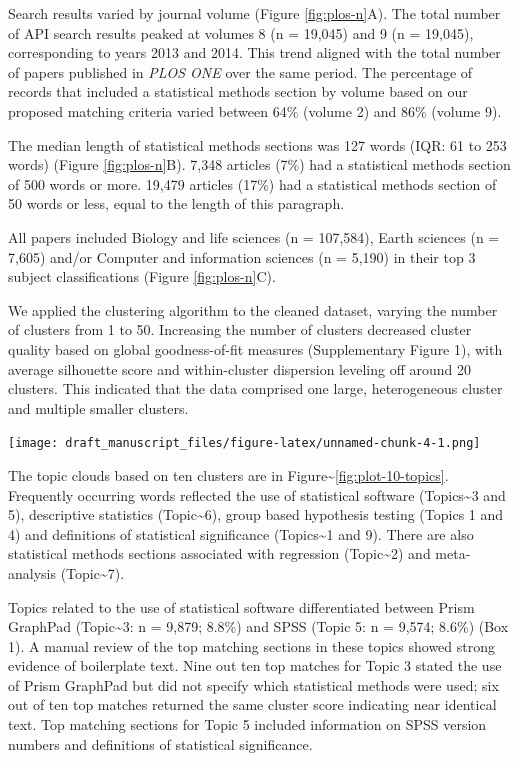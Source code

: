 \documentclass[
]{article}
\begin{document}
Search results varied by journal volume (Figure \ref{fig:plos-n}A). The total number of API search results peaked at volumes 8 (n = 19,045) and 9 (n = 19,045), corresponding to years 2013 and 2014. This trend aligned with the total number of papers published in \emph{PLOS ONE} over the same period. The percentage of records that included a statistical methods section by volume based on our proposed matching criteria varied between 64\% (volume 2) and 86\% (volume 9).

The median length of statistical methods sections was 127 words (IQR: 61 to 253 words) (Figure \ref{fig:plos-n}B). 7,348 articles (7\%) had a statistical methods section of 500 words or more. 19,479 articles (17\%) had a statistical methods section of 50 words or less, equal to the length of this paragraph.

All papers included Biology and life sciences (n = 107,584), Earth sciences
(n = 7,605) and/or Computer and information sciences (n = 5,190) in their top 3 subject classifications
(Figure \ref{fig:plos-n}C).

We applied the clustering algorithm to the cleaned dataset, varying the number of clusters from 1 to 50. Increasing the number of clusters decreased cluster quality based on global goodness-of-fit measures (Supplementary Figure 1), with average silhouette score and within-cluster dispersion leveling off around 20 clusters. This indicated that the data comprised one large, heterogeneous cluster and multiple smaller clusters.

\texttt{[image: draft\_manuscript\_files/figure-latex/unnamed-chunk-4-1.png]}

The topic clouds based on ten clusters are in Figure\textasciitilde\ref{fig:plot-10-topics}. Frequently occurring words reflected the use of statistical software (Topics\textasciitilde3 and 5), descriptive statistics (Topic\textasciitilde6), group based hypothesis testing (Topics 1 and 4) and definitions of statistical significance (Topics\textasciitilde1 and 9). There are also statistical methods sections associated with regression (Topic\textasciitilde2) and meta-analysis (Topic\textasciitilde7).

Topics related to the use of statistical software differentiated between Prism GraphPad (Topic\textasciitilde3: n = 9,879; 8.8\%) and SPSS (Topic 5: n = 9,574; 8.6\%) (Box 1). A manual review of the top matching sections in these topics showed strong evidence of boilerplate text. Nine out ten top matches for Topic 3 stated the use of Prism GraphPad but did not specify which statistical methods were used; six out of ten top matches returned the same cluster score indicating near identical text. Top matching sections for Topic 5 included information on SPSS version numbers and definitions of statistical significance.
\end{document}
